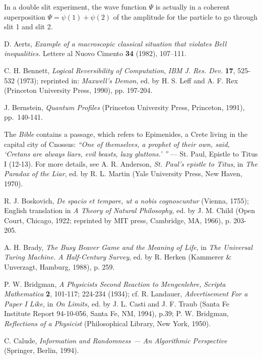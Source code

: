 \begin{thebibliography}{99}

In a double slit  experiment, the
wave function $\Psi$ is actually in a coherent superposition $\Psi
=\psi
(1)+ \psi (2)$ of the amplitude for the particle to go through slit 1
and slit 2.

 D. Aerts,
{\it Example of a macroscopic classical situation that violates Bell
inequalities.}
Lettere al Nuovo Cimento {\bf 34} (1982), 107--111.

C. H. Bennett,
{\it Logical Reversibility of Computation},
{\sl IBM J. Res. Dev.} {\bf 17}, 525-532 (1973);
reprinted in: {\sl Maxwell's Demon}, ed. by H. S. Leff and A. F. Rex
(Princeton University Press, 1990), pp. 197-204.

J. Bernstein, {\sl Quantum Profiles} (Princeton
University Press, Princeton, 1991), pp.\ 140-141.


 The {\sl Bible} contains a passage, which
 refers to Epimenides, a Crete living in the capital city of
 Cnossus:
 {\it ``One of themselves, a prophet of their own, said, `Cretans are
 always liars, evil beasts, lazy gluttons.'  ''} --- St. Paul,
 Epistle to Titus I (12-13).
 For more details, see
 A. R. Anderson, {\sl St. Paul's epistle to Titus}, in {\sl The Paradox
 of the Liar}, ed. by R. L. Martin (Yale University Press, New Haven,
 1970).

R. J. Boskovich,
{\sl De spacio et tempore, ut a nobis cognoscuntur} (Vienna, 1755);
English translation in {\sl A Theory of Natural Philosophy,} ed. by
J. M. Child (Open Court, Chicago, 1922; reprinted by MIT press,
Cambridge, MA, 1966), p. 203-205.

 A. H. Brady, {\sl The Busy Beaver Game and the Meaning of Life}, in
{\sl The Universal Turing Machine. A Half-Century Survey}, ed. by R.
 Herken (Kammerer \& Unverzagt, Hamburg, 1988), p. 259.

P. W. Bridgman,
{\sl A Physicists Second Reaction to
Mengenlehre,}
{\sl Scripta Mathematica} {\bf 2}, 101-117; 224-234 (1934); cf.
R. Landauer,
{\sl Advertisement For a Paper I Like,}
in {\sl On Limits,} ed. by J. L. Casti and J. F. Traub
(Santa Fe Institute Report 94-10-056, Santa Fe, NM, 1994), p.39;
P. W. Bridgman,
{\sl Reflections of a Physicist}
(Philosophical Library, New York, 1950).


C. Calude,
{\sl Information and Randomness --- An Algorithmic Perspective}
(Springer, Berlin, 1994).


\end{thebibliography}
